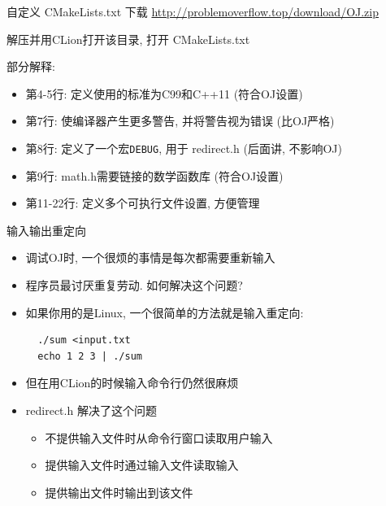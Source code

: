 \begin{frame}[fragile]{自定义 CMakeLists.txt}
下载 \href{http://problemoverflow.top/download/OJ.zip}{http://problemoverflow.top/download/OJ.zip}

解压并用CLion打开该目录, 打开 CMakeLists.txt

\emptyline

部分解释:
\begin{itemize}[<+- | alert@+>]

\item 第4-5行: 定义使用的标准为C99和C++11 (符合OJ设置)

\item 第7行: 使编译器产生更多警告, 并将警告视为错误 (比OJ严格)

\item 第8行: 定义了一个宏\texttt{DEBUG}, 用于 redirect.h (后面讲, 不影响OJ)

\item 第9行: math.h需要链接的数学函数库 (符合OJ设置)

\item 第11-22行: 定义多个可执行文件设置, 方便管理
\end{itemize}

\end{frame}


\begin{frame}[fragile]{输入输出重定向}
\begin{itemize}[<+- | alert@+>]
\item 调试OJ时, 一个很烦的事情是每次都需要重新输入

\item 程序员最讨厌重复劳动. 如何解决这个问题? 

\item 如果你用的是Linux, 一个很简单的方法就是输入重定向:
\begin{verbatim}
  ./sum <input.txt
  echo 1 2 3 | ./sum
\end{verbatim}

\item 但在用CLion的时候输入命令行仍然很麻烦
\item redirect.h 解决了这个问题
\begin{itemize}
\item 不提供输入文件时从命令行窗口读取用户输入
\item 提供输入文件时通过输入文件读取输入
\item 提供输出文件时输出到该文件
\end{itemize}
\end{itemize}
\end{frame}


